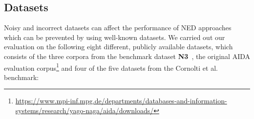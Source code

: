 \documentclass{llncs}
\begin{document}

\subsection{Datasets}
Noisy and incorrect datasets can affect the performance of NED approaches which can be prevented by using well-known datasets.
We carried out our evaluation on the following eight different, publicly available datasets, which consists of the three corpora from the benchmark dataset \textbf{N3}~\cite{N3}, the original AIDA evaluation corpus\footnote{\url{https://www.mpi-inf.mpg.de/departments/databases-and-information-systems/research/yago-naga/aida/downloads/}} and four of the five datasets from the Cornolti et al.~\cite{Cornolti} benchmark:
\end{document}
